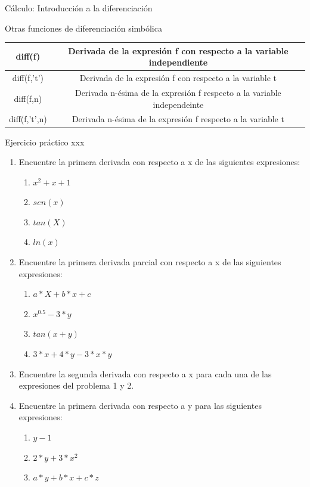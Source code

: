 \documentclass{bredelebeamer}
\begin{document}
\begin{frame}{Cálculo: Introducción a la diferenciación}
\begin{center}
Otras funciones de diferenciación simbólica
\end{center}
\begin{table}[]
\centering
\begin{tabular}{|c|c|}
\hline
diff(f)       & Derivada de la expresión f con respecto a la variable independiente     \\ \hline
diff(f,'t')   & Derivada de la expresión f con respecto a la variable t                 \\ \hline
diff(f,n)     & Derivada n-ésima de la expresión f respecto a la variable independeinte \\ \hline
diff(f,'t',n) & Derivada n-ésima de la expresión f respecto a la variable t             \\ \hline
\end{tabular}
\end{table}
\end{frame}

\begin{frame}{Ejercicio práctico xxx}
\begin{enumerate}
\item Encuentre la primera derivada con respecto a x de las siguientes expresiones:
\begin{enumerate}
\item $x^2+x+1$
\item $sen(x)$
\item $tan(X)$
\item $ln(x)$
\end{enumerate}
\item Encuentre la primera derivada parcial con respecto a x de las siguientes expresiones:
\begin{enumerate}
\item $a*X+b*x+c$
\item $x^0.5 -3*y$
\item $tan(x+y)$
\item $3*x+4*y-3*x*y$
\end{enumerate}
\item Encuentre la segunda derivada con respecto a x para cada una de las expresiones del problema 1 y 2.
\item Encuentre la primera derivada con respecto a y para las siguientes expresiones:
\begin{enumerate}
\item $y-1$
\item $2*y+3*x^2$
\item $a*y+b*x+c*z$
\end{enumerate}
\end{enumerate}
\end{frame}
\end{document}
